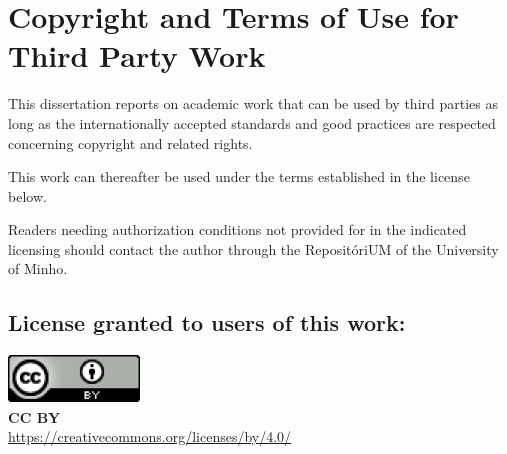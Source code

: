 \chapter*{Copyright and Terms of Use for Third Party Work}
\noindent
This dissertation reports on academic work that can be used by third parties as long as the internationally accepted standards and good practices are respected concerning copyright and related rights.

\noindent
This work can thereafter be used under the terms established in the license below.

\noindent
Readers needing authorization conditions not provided for in the indicated licensing should contact the author through the RepositóriUM of the University of Minho.

\section*{License granted to users of this work:}


\noindent
\includegraphics[]{images/CCBY.png}
\\
\textbf{CC BY}
\\
\url{https://creativecommons.org/licenses/by/4.0/}

